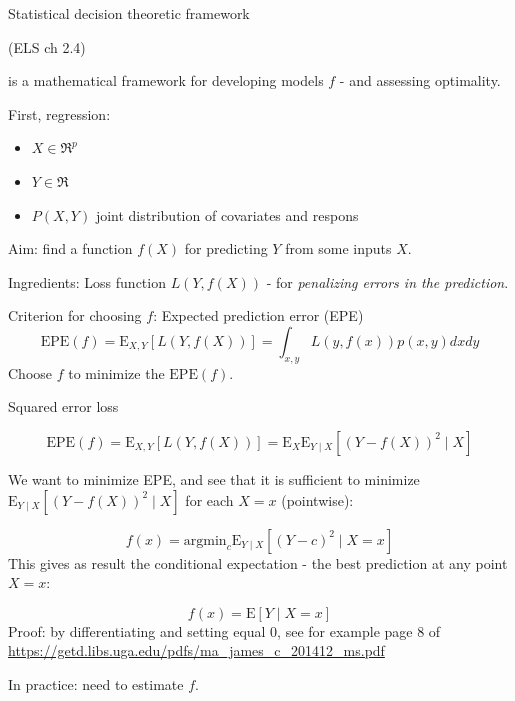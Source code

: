 \documentclass[
  ignorenonframetext,
]{beamer}
\providecommand{\tightlist}{%
  \setlength{\itemsep}{0pt}\setlength{\parskip}{0pt}}
\begin{document}
\begin{frame}{Statistical decision theoretic framework}
\protect\hypertarget{statistical-decision-theoretic-framework}{}

(ELS ch 2.4)

is a mathematical framework for developing models \(f\) - and assessing
optimality.

First, regression:

\begin{itemize}
\tightlist
\item
  \(X \in \Re^p\)
\item
  \(Y \in \Re\)
\item
  \(P(X,Y)\) joint distribution of covariates and respons
\end{itemize}

Aim: find a function \(f(X)\) for predicting \(Y\) from some inputs
\(X\).

Ingredients: Loss function \(L(Y,f(X))\) - for \emph{penalizing errors
in the prediction}.

Criterion for choosing \(f\): Expected prediction error (EPE)
\[ \text{EPE}(f)=\text{E}_{X,Y}[L(Y,f(X))]=\int_{x,y}L(y,f(x))p(x,y)dxdy\]
Choose \(f\) to minimize the \(\text{EPE}(f)\).

\end{frame}

\begin{frame}

\begin{block}{Squared error loss}

\[ \text{EPE}(f)=\text{E}_{X,Y}[L(Y,f(X))]=\text{E}_{X}\text{E}_{Y \mid X}[(Y-f(X))^2\mid X]\]

We want to minimize EPE, and see that it is sufficient to minimize
\(\text{E}_{Y\mid X}[(Y-f(X))^2\mid X]\) for each \(X=x\) (pointwise):

\[ f(x)=\text{argmin}_c \text{E}_{Y \mid X}[(Y-c)^2 \mid X=x]\] This
gives as result the conditional expectation - the best prediction at any
point \(X=x\):

\[ f(x)=\text{E}[Y \mid X=x]\] Proof: by differentiating and setting
equal 0, see for example page 8 of
\url{https://getd.libs.uga.edu/pdfs/ma_james_c_201412_ms.pdf}

In practice: need to estimate \(f\).

\end{block}

\end{frame}
\end{document}
